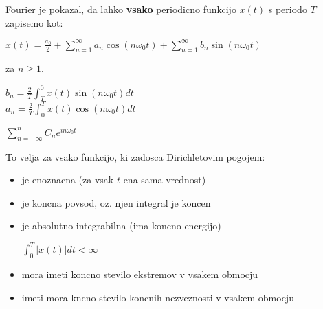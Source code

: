 \documentclass{article}
\begin{document}
\begin{multicols}{4}
	Fourier je pokazal, da lahko \textbf{vsako} periodicno funkcijo $x(t)$ s periodo $T$ zapisemo kot:
	\begin{center}
		\begin{math}
			x(t) = \frac{a_0}{2} + \sum_{n = 1}^{\infty} a_n \cos(n \omega_0 t) +
			\sum_{n = 1}^{\infty} b_n \sin(n \omega_0 t)
		\end{math}
	\end{center}
	za $n \geq 1$.

	\begin{center}
		\begin{math}
			b_n = \frac{2}{T} \int_T^0 x(t) \sin( n \omega_0 t ) dt
		\end{math}\\
		\begin{math}
			a_n = \frac{2}{T} \int_0^T x(t) \cos( n \omega_0 t ) dt
		\end{math}
	\end{center}

	\begin{center}
		\begin{math}
			\sum_{n = -\infty} ^n C_n e^{i n \omega_0 t}
		\end{math}
	\end{center}

	To velja za vsako funkcijo, ki zadosca Dirichletovim pogojem:
	\begin{itemize}
		\item je enoznacna (za vsak $t$ ena sama vrednost)
		\item je koncna povsod, oz. njen integral je koncen
		\item je absolutno integrabilna (ima koncno energijo)
		      \begin{center}
			      $\int_0^T |x(t)| dt < \infty$
		      \end{center}
		\item mora imeti koncno stevilo ekstremov v vsakem obmocju
		\item imeti mora kncno stevilo koncnih nezveznosti v vsakem obmocju
	\end{itemize}


\end{multicols}
\end{document}
